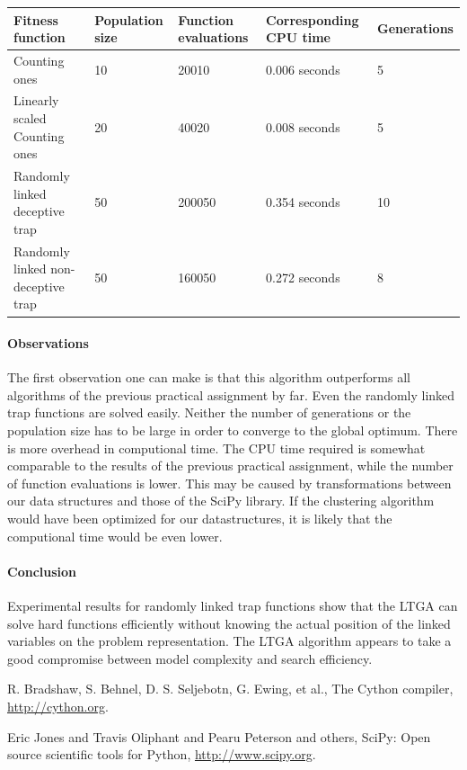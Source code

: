 \documentclass[12pt]{article}
\theoremstyle{definition}
\begin{document}
\begin{table}[!htb]
\begin{adjustwidth}{-2cm}{}
\centering
\begin{tabular}{lp{2.5cm}p{2.5cm}p{2.8cm}p{2.5cm}}
\toprule[1.5pt]
\bf Fitness function & \bf Population size & \bf Function evaluations & \bf Corresponding CPU time& \bf Generations\\\midrule
Counting ones & 10 & 20010 & 0.006 seconds & 5 \\
Linearly scaled Counting ones & 20 & 40020 & 0.008 seconds & 5 \\
Randomly linked deceptive trap & 50 & 200050 & 0.354 seconds & 10 \\
Randomly linked non-deceptive trap & 50 & 160050 & 0.272 seconds & 8 \\
\bottomrule[1.25pt]
\end{tabular}\par
\bigskip
{}
\label{tab:exp}
\end{adjustwidth}
\end{table}

\paragraph{Observations}
The first observation one can make is that this algorithm outperforms all algorithms of the
previous practical assignment by far.
Even the randomly linked trap functions are solved easily.
Neither the number of generations or the population size has to be large in order to
converge to the global optimum.
There is more overhead in computional time.
The CPU time required is somewhat comparable to the results of the previous practical assignment,
while the number of function evaluations is lower.
This may be caused by transformations between our data structures and those of the SciPy library.
If the clustering algorithm would have been optimized for our datastructures,
it is likely that the computional time would be even lower.

\paragraph{Conclusion}
Experimental results for randomly linked trap functions show that the LTGA can solve hard functions efficiently without knowing the actual position of the linked variables on the problem representation.
The LTGA algorithm appears to take a good compromise between model complexity and search efficiency.


\begin{thebibliography}{9}

R. Bradshaw, S. Behnel, D. S. Seljebotn, G. Ewing, et al.,
The Cython compiler, \url{http://cython.org}.

Eric Jones and Travis Oliphant and Pearu Peterson and others,
SciPy: Open source scientific tools for Python, \url{http://www.scipy.org}.

\end{thebibliography}
\end{document}
